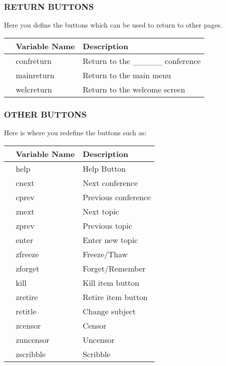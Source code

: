 \documentclass[twoside]{report}
\begin{document}
      \subsubsection*{RETURN BUTTONS}
         Here you define the buttons which can be used to return to other 
         pages.

         \vspace{12pt}
         \begin{tabular}{lll}
         &Variable Name & Description \\ \hline
         & confreturn\index{confreturn} & Return to the \_\_\_\_\_ conference\\
         & mainreturn\index{mainreturn} & Return to the main menu \\
         & welcreturn\index{welcreturn} & Return to the welcome screen \\ \hline
         \end{tabular}

      \subsubsection*{OTHER BUTTONS}
         Here is where you redefine the buttons such as:

         \vspace{12pt}
         \begin{tabular}{lll}
         & Variable Name & Description \\ \hline
         & help\index{help} & Help Button \\
         & cnext\index{cnext} & Next conference \\
         & cprev\index{cprev} & Previous conference \\
         & znext\index{znext} & Next topic  \\
         & zprev\index{zprev} & Previous topic \\
         & enter\index{enter} & Enter new topic \\
         & zfreeze\index{zfreeze} & Freeze/Thaw \\
         & zforget\index{zforget} & Forget/Remember \\
         & kill\index{kill} & Kill item button \\
         & zretire\index{zretire} & Retire item button \\ 
         & retitle\index{retitle} & Change subject \\
         & zcensor\index{zcensor} & Censor \\
         & zuncensor\index{zuncensor} & Uncensor \\
         & zscribble\index{zscribble} & Scribble \\ \hline
         \end{tabular}
\end{document}
